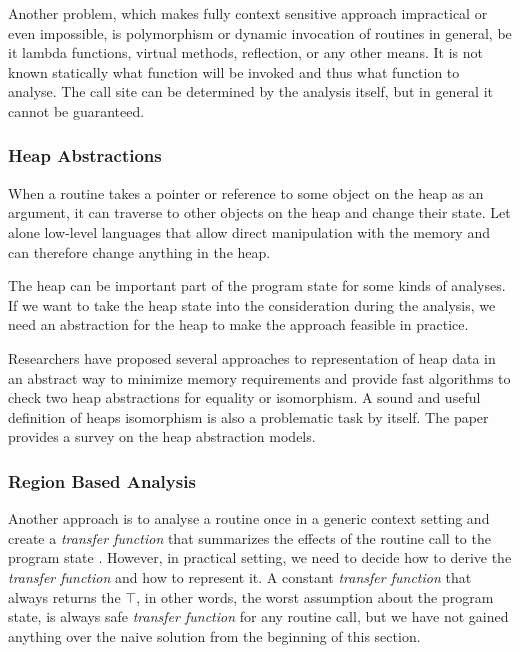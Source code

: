         Another problem, which makes fully context sensitive 
        approach impractical or even impossible, is polymorphism 
        or dynamic invocation of routines in general, be it 
        lambda functions, virtual methods, reflection, 
        or any other means. It is not known statically what 
        function will be invoked and thus what function to analyse. 
        The call site can be determined by the analysis itself, 
        but in general it cannot be guaranteed.
        
        \subsubsection*{Heap Abstractions}
        
        When a routine takes a pointer or reference to some object 
        on the heap as an argument, it can traverse to other 
        objects on the heap and change their state. Let alone low-level 
        languages that allow direct manipulation with the memory and 
        can therefore change anything in the heap. 
        
        The heap can be important part of the program state for 
        some kinds of analyses. If we want to take the heap state 
        into the consideration during the analysis, we need an 
        abstraction for the heap to make the approach feasible 
        in practice.
        
        Researchers have proposed several approaches to representation 
        of heap data in an abstract way to minimize memory requirements 
        and provide fast algorithms to check two heap abstractions 
        for equality or isomorphism. A sound and useful definition 
        of heaps isomorphism is also a problematic task by itself. 
        The paper \cite{kanvar2014heap} provides a survey on the heap 
        abstraction models.
        
        \subsubsection*{Region Based Analysis}
        
        Another approach is to analyse a routine once in a 
        generic context setting and create a \emph{transfer function} 
        that summarizes the effects of the routine call to the 
        program state \cite{aho1985compilers}. However, in practical setting, 
        we need to decide how to derive the \emph{transfer function} and how to 
        represent it. A constant \emph{transfer function} that always 
        returns the $\top$, in other words, the worst assumption about 
        the program state, is always safe \emph{transfer function} 
        for any routine call, but we have not gained anything over 
        the naive solution from the beginning of this section.
        
